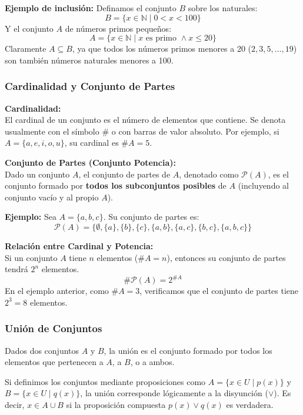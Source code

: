 \noindent \textbf{Ejemplo de inclusión:}
Definamos el conjunto $B$ sobre los naturales:
\[ B=\{x \in \mathbb{N} \mid 0 < x < 100 \} \]
Y el conjunto $A$ de números primos pequeños:
\[ A=\{x \in \mathbb{N} \mid x \text{ es primo } \land x \le 20 \} \]
Claramente $A \subseteq B$, ya que todos los números primos menores a 20 ($2, 3, 5, \dots, 19$) son también números naturales menores a 100.

\vspace{0.5cm}

\subsubsection{Cardinalidad y Conjunto de Partes}

\textbf{Cardinalidad:} \\
El cardinal de un conjunto es el número de elementos que contiene. Se denota usualmente con el símbolo $\#$ o con barras de valor absoluto. Por ejemplo, si $A=\{a, e, i, o, u\}$, su cardinal es $\#A=5$.

\textbf{Conjunto de Partes (Conjunto Potencia):} \\
Dado un conjunto $A$, el conjunto de partes de $A$, denotado como $\mathcal{P}(A)$, es el conjunto formado por \textbf{todos los subconjuntos posibles} de $A$ (incluyendo al conjunto vacío y al propio $A$).

\noindent \textbf{Ejemplo:}
Sea $A=\{a,b,c\}$. Su conjunto de partes es:
\[ \mathcal{P}(A) = \{ \emptyset, \{a\}, \{b\}, \{c\}, \{a,b\}, \{a,c\}, \{b,c\}, \{a,b,c\} \} \]

\noindent \textbf{Relación entre Cardinal y Potencia:} \\
Si un conjunto $A$ tiene $n$ elementos ($\#A=n$), entonces su conjunto de partes tendrá $2^n$ elementos.
\[ \#\mathcal{P}(A) = 2^{\#A} \]
En el ejemplo anterior, como $\#A=3$, verificamos que el conjunto de partes tiene $2^3=8$ elementos.

\subsubsection{Unión de Conjuntos}

Dados dos conjuntos $A$ y $B$, la unión es el conjunto formado por todos los elementos que pertenecen a $A$, a $B$, o a ambos.

Si definimos los conjuntos mediante proposiciones como $A=\{ x\in U \mid p(x)\}$ y $B=\{ x\in U \mid q(x)\}$, la unión corresponde lógicamente a la disyunción ($\lor$). Es decir, $x \in A \cup B$ si la proposición compuesta $p(x) \lor q(x)$ es verdadera.

